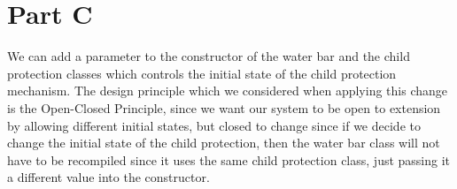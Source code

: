 \documentclass{article}
\begin{document}
\section{Part C}

We can add a parameter to the constructor of the water bar and the child protection classes which controls the initial state of the child protection mechanism. The design principle which we considered when applying this change is the Open-Closed Principle, since we want our system to be open to extension by allowing different initial states, but closed to change since if we decide to change the initial state of the child protection, then the water bar class will not have to be recompiled since it uses the same child protection class, just passing it a different value into the constructor.
\end{document}
